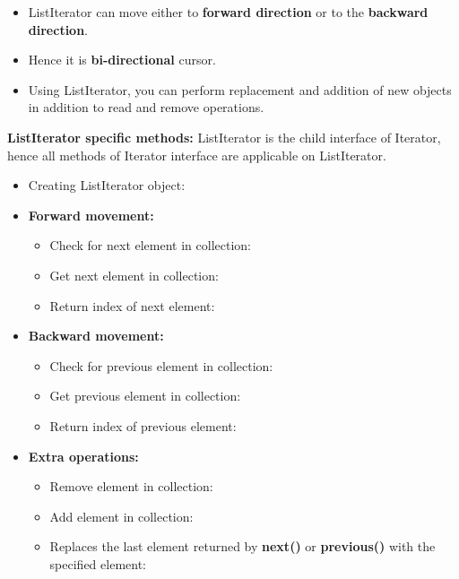 \setlength{\columnsep}{3pt}
\begin{flushleft}
	
	\begin{itemize}
		\item ListIterator can move either to \textbf{forward direction} or to the \textbf{backward direction}. 
		\item Hence it is \textbf{bi-directional} cursor.
		\item Using ListIterator, you can perform replacement and addition of new objects in addition to read and remove operations.
	\end{itemize}
	
	\textbf{ListIterator specific methods:}
	ListIterator is the child interface of Iterator, hence all methods of Iterator interface are applicable on ListIterator.
	
	\begin{itemize}
		\item Creating ListIterator object:
		\bigskip
		\item \textbf{Forward movement:}
		\begin{itemize}
			\item Check for next element in collection: 
			\bigskip
			\item Get next element in collection: 
			\bigskip
			\item Return index of next element:
		\end{itemize}
		
		\item \textbf{Backward movement:}
		\begin{itemize}
			\item Check for previous element in collection: 
			\bigskip
			\item Get previous element in collection: 
			\bigskip
			\item Return index of previous element:
		\end{itemize}

		\item \textbf{Extra operations:}
		\begin{itemize}
			\item Remove element in collection:
			\bigskip
			\item Add element in collection:
			\bigskip
			\item  Replaces the last element returned by \textbf{next()} or \textbf{previous()} with the specified element:
		\end{itemize}	
	\end{itemize}
	\newpage
	

\end{flushleft}
